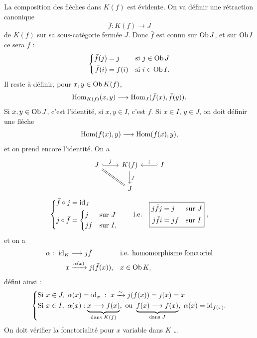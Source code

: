 La composition des flèches dans $K(f)$ est évidente. On va définir une rétraction canonique
\[ \bar{f} : K(f) \longrightarrow J \]
de $K(f)$ sur sa sous-catégorie fermée $J$. Donc $\bar{f}$ est connu sur $\mathrm{Ob}\, J$, et sur $\mathrm{Ob}\, I$ ce sera $f$ :
\[
\left\{
\begin{aligned}
\bar{f}(j) &= j && \text{si } j \in \mathrm{Ob}\, J\\
\bar{f}(i) &= f(i) && \text{si } i \in \mathrm{Ob}\, I.
\end{aligned}
\right.
\]
Il reste à définir, pour $x, y \in \mathrm{Ob}\, K(f)$,
\[ \mathrm{Hom}_{K(f)}(x,y) \longrightarrow \mathrm{Hom}_J(\bar{f}(x), \bar{f}(y)). \]
Si $x, y \in \mathrm{Ob}\, J$, c'est l'identité, si $x, y \in I$, c'est $f$. Si $x \in I$, $y \in J$, on doit définir une flèche
\[ \mathrm{Hom}(f(x),y) \longrightarrow \mathrm{Hom}(f(x),y), \]
et on prend encore l'identité. On a
\[
\begin{tikzcd}
J \arrow[r, hook, "j"] \arrow[dr, equal] & K(f) \arrow[d, "\bar{f}"] & I \arrow[l, hook', "i"'] \\
& J &
\end{tikzcd}
\]
\[
\left\{
\begin{aligned}
\bar{f} \circ j &= \mathrm{id}_J\\
j \circ \bar{f} &= \left\{
\begin{aligned}
&j && \text{sur } J\\
&jf && \text{sur } I,
\end{aligned}
\right.
\end{aligned}
\right.
\qquad \text{i.e.} \quad
\boxed{
\begin{aligned}
j\bar{f}j &= j && \text{sur } J\\
j\bar{f}i &= jf && \text{sur } I
\end{aligned}
}\ ,
\]
et on a
\[
\begin{aligned}
\alpha :\ \mathrm{id}_K &\longrightarrow j\bar{f} && \text{i.e. homomorphisme fonctoriel}\\
x &\xrightarrow{\alpha(x)} j(\bar{f}(x)), && x \in \mathrm{Ob}\, K,
\end{aligned}
\]
défini ainsi :
\[
\left\{
\begin{aligned}
&\text{Si } x \in J,\ \alpha(x) = \mathrm{id}_x\ :\ x \xrightarrow{\sim} j(\bar{f}(x)) = j(x) = x\\
&\text{Si } x \in I,\ \alpha(x) : \underbrace{x \longrightarrow f(x)}_{\text{dans } K(f)},\ \text{ou } \underbrace{f(x) \longrightarrow f(x)}_{\text{dans } J},\ \alpha(x) = \mathrm{id}_{f(x)}.
\end{aligned}
\right.
\]
On doit vérifier la fonctorialité pour $x$ variable dans $K$ \dots

